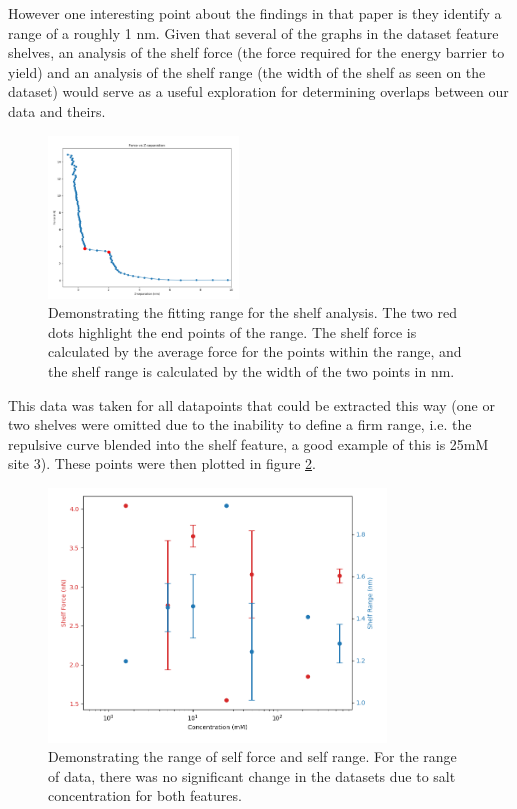 However one interesting point about the findings in that paper is they identify a range of a roughly 1 nm. Given that several of the graphs in the dataset feature shelves, an analysis of the shelf force (the force required for the energy barrier to yield) and an analysis of the shelf range (the width of the shelf as seen on the dataset) would serve as a useful exploration for determining overlaps between our data and theirs.

\begin{figure}[h!]
\centering
\includegraphics[width=0.45\textwidth]{chapter8/Shelf/Force calculatio.png}
\caption{Demonstrating the fitting range for the shelf analysis. The two red dots highlight the end points of the range. The shelf force is calculated by the average force for the points within the range, and the shelf range is calculated by the width of the two points in nm.}
\label{fig:forcecalc}
\end{figure}

This data was taken for all datapoints that could be extracted this way (one or two shelves were omitted due to the inability to define a firm range, i.e. the repulsive curve blended into the shelf feature, a good example of this is 25mM site 3). These points were then plotted in figure \ref{fig:resultsShelf}.

\begin{figure}[h!!]
\centering
\includegraphics[width=0.8\textwidth]{chapter8/Shelf/ShelfScatter2.png}
\caption{Demonstrating the range of self force and self range. For the range of data, there was no significant change in the datasets due to salt concentration for both features.}
\label{fig:resultsShelf}
\end{figure}

